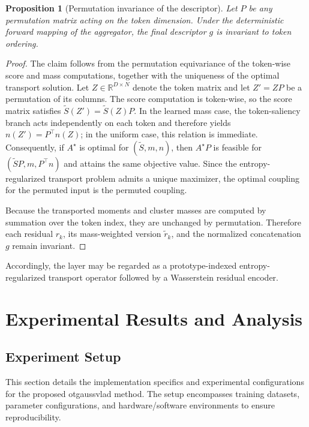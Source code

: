 \documentclass[journal]{IEEEtran}
\newtheorem{proposition}{Proposition}
\begin{document}
\begin{proposition}[Permutation invariance of the descriptor]
Let \(P\) be any permutation matrix acting on the token dimension. Under the deterministic forward mapping of the aggregator, the final descriptor \(g\) is invariant to token ordering.
\end{proposition}
\begin{proof}
The claim follows from the permutation equivariance of the token-wise score and mass computations, together with the uniqueness of the optimal transport solution.
Let \(Z\in\mathbb{R}^{D\times N}\) denote the token matrix and let \(Z' = ZP\) be a permutation of its columns. The score computation is token-wise, so the score matrix satisfies \(\tilde{S}(Z') = \tilde{S}(Z)P\). In the learned mass case, the token-saliency branch acts independently on each token and therefore yields \(n(Z') = P^\top n(Z)\); in the uniform case, this relation is immediate. Consequently, if \(A^\star\) is optimal for \((\tilde{S},m,n)\), then \(A^\star P\) is feasible for \((\tilde{S}P,m,P^\top n)\) and attains the same objective value. Since the entropy-regularized transport problem admits a unique maximizer, the optimal coupling for the permuted input is the permuted coupling.

Because the transported moments and cluster masses are computed by summation over the token index, they are unchanged by permutation. Therefore each residual \(r_k\), its mass-weighted version \(\tilde{r}_k\), and the normalized concatenation \(g\) remain invariant.
\end{proof}

Accordingly, the layer may be regarded as a prototype-indexed entropy-regularized transport operator followed by a Wasserstein residual encoder.

\section{Experimental Results and Analysis}
\subsection{Experiment Setup}
This section details the implementation specifics and experimental configurations for the proposed otgaussvlad method. The setup encompasses training datasets, parameter configurations, and hardware/software environments to ensure reproducibility.
\end{document}
